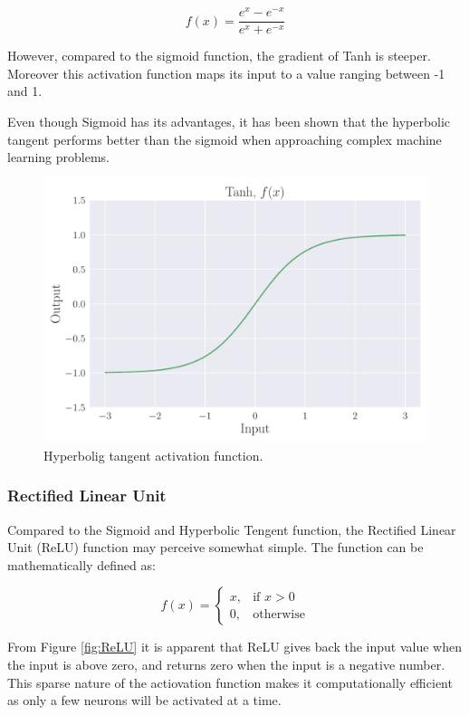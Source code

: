 \documentclass[a4paper, UKenglish, 11pt]{uiomaster}
\begin{document}
\begin{equation}
  f(x) = \frac{{e^x - e^{-x}}}{{e^x + e^{-x}}}
\label{eq:I}
\end{equation}


 However, compared to the sigmoid function, the gradient of Tanh is steeper. Moreover this activation function maps its input to a value ranging between -1 and 1.

Even though Sigmoid has its advantages, it has been shown that the hyperbolic tangent performs better than the sigmoid when approaching complex machine learning problems.

\begin{figure}
    \centering
    \includegraphics[width=\linewidth]{figures/Tanh.pdf}
    \caption{Hyperbolig tangent activation function.}
    \label{fig:Tanh}
\end{figure}

\subsubsection{Rectified Linear Unit}
Compared to the Sigmoid and Hyperbolic Tengent function, the Rectified Linear Unit (ReLU) function may perceive somewhat simple. The function can be mathematically defined as:

\begin{equation}
    f(x) = \begin{cases}
        x, & \text{if } x > 0 \\
        0, & \text{otherwise}
    \end{cases}
\label{eq:ReLU}
\end{equation}

From Figure \ref{fig:ReLU} it is apparent that ReLU gives back the input value when the input is above zero, and returns zero when the input is a negative number. This sparse nature of the actiovation function makes it computationally efficient as only a few neurons will be activated at a time.
\end{document}
